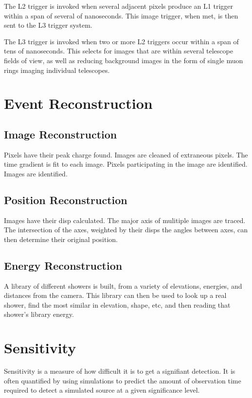 The L2 trigger is invoked when several adjacent pixels produce an L1 trigger within a span of several of nanoseconds.
This image trigger, when met, is then sent to the L3 trigger system.

The L3 trigger is invoked when two or more L2 triggers occur within a span of tens of nanoseconds.
This selects for images that are within several telescope fields of view, as well as reducing background images in the form of single muon rings imaging individual telescopes.

\section{Event Reconstruction}\label{sec:recon}

\subsection{Image Reconstruction}\label{subsec:imgrecon}
Pixels have their peak charge found.
Images are cleaned of extraneous pixels.
The time gradient is fit to each image.
Pixels participating in the image are identified.
Images are identified.

\subsection{Position Reconstruction}\label{subsec:posrecon}
Images have their disp calculated.
The major axis of mulitiple images are traced.
The intersection of the axes, weighted by their disps the angles between axes, can then determine their original position.

\subsection{Energy Reconstruction}\label{subsec:enrecon}
A library of different showers is built, from a variety of elevations, energies, and distances from the camera.
This library can then be used to look up a real shower, find the most similar in elevation, shape, etc, and then reading that shower's library energy.

\section{Sensitivity}
Sensitivity is a measure of how difficult it is to get a signifiant detection.
It is often quantified by using simulations to predict the amount of observation time required to detect a simulated source at a given significance level.

